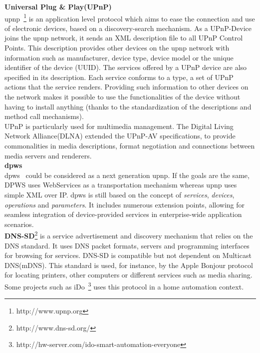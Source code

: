 {\bf Universal Plug \& Play(UPnP)}\\
\gls{upnp}~\footnote{http://www.upnp.org} is an application level protocol which aims to ease the connection and use of electronic devices, based on a discovery-search mechanism. As a UPnP-Device joins the \gls{upnp} network, it sends an XML description file to all UPnP Control Points. This description provides other devices on the \gls{upnp} network with information such as manufacturer, device type, device model or the unique identifier of the device (UUID). The services offered by a UPnP device are also specified in its description. Each service conforms to a type, a set of UPnP actions that the service renders. Providing such information to other devices on the network makes it possible to use the functionalities of the device without having to install anything (thanks to the standardization of the descriptions and method call mechanisms).\\
UPnP is particularly used for multimedia management. The Digital Living Network Alliance(DLNA) extended the UPnP-AV specifications, to provide commonalities in media descriptions, format negotiation and connections between media servers and renderers.\\

{\bf \gls{dpws}}\\
\gls{dpws}~\cite{DPWS} could be considered as a next generation \gls{upnp}. If the goals are the same, DPWS uses WebServices as a transportation mechanism whereas \gls{upnp} uses simple XML over IP. \gls{dpws} is still based on the concept of \textit{services}, \textit{devices}, \textit{operations} and \textit{parameters}. It includes numerous extension points, allowing for seamless integration of device-provided services in enterprise-wide application scenarios.\\

{\bf DNS-SD}\footnote{http://www.dns-sd.org/} is a service advertisement and discovery mechanism that relies on the DNS standard. It uses DNS packet formats, servers and programming interfaces for browsing for services. DNS-SD is compatible but not dependent on Multicast DNS(mDNS). This standard is used, for instance, by the Apple Bonjour protocol for locating printers, other computers or different services such as media sharing. Some projects such as iDo~\footnote{http://hw-server.com/ido-smart-automation-everyone} uses this protocol in a home automation context.\\

